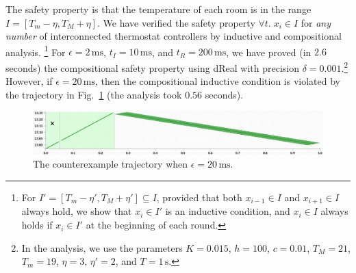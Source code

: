 The safety property is that the temperature of each room
is in the range $I = [T_m - \eta, T_M + \eta]$.
We have verified the safety property $\forall t.\; x_i \in I$
for  \emph{any number} of interconnected thermostat controllers
by inductive and compositional analysis.%
\footnote{For %
$I' = [T_m - \eta', T_M + \eta']\subseteq I$,
provided that both $x_{i-1} \in I$ and $x_{i+1} \in I$ always hold,
we show that $x_i \in I'$ is an inductive condition,
and $x_i \in I$ always holds
if $x_i \in I'$ at the beginning of each round.}
%
For $\epsilon = 2\,\mathrm{ms}$,
$t_I = 10\,\mathrm{ms}$,
and $t_R = 200\,\mathrm{ms}$,
we have proved (in $2.6$ seconds) the compositional safety property 
 using \textsf{dReal} with precision $\delta = 0.001$.\footnote{In the analysis, we use the parameters $K = 0.015$, 
$h = 100$,
$c = 0.01$,
$T_M = 21$, 
$T_m = 19$,
$\eta = 3$, $\eta' = 2$,
and $T = 1\,\mathrm{s}$.}
%
However, if $\epsilon = 20\,\mathrm{ms}$,
then the compositional inductive condition is violated by the trajectory in Fig.~\ref{fig:thermo-error}
(the analysis took $0.56$ seconds).


\begin{figure}
\centering
\includegraphics[clip=true,trim=1ex 1ex 1ex 1ex,width=\columnwidth]{thermo-error.png}    
\caption{The counterexample trajectory when $\epsilon = 20\,\mathrm{ms}$.
} \label{fig:thermo-error}
\end{figure}


%



